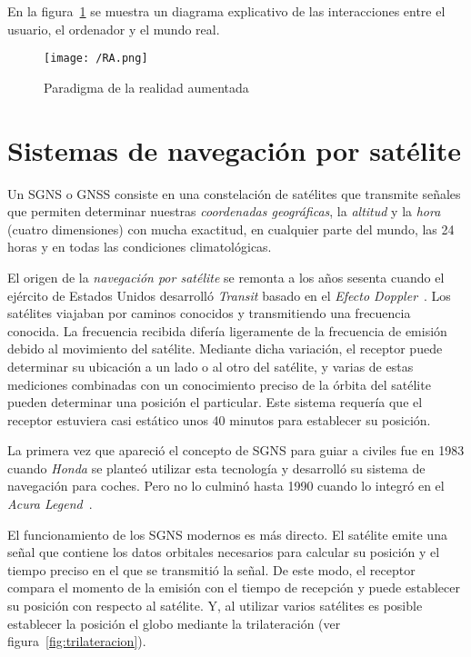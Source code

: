 En la figura~\ref{fig:ra} se muestra un diagrama explicativo de las interacciones entre el usuario,
el ordenador y el mundo real.

\begin{figure}[!h]
  \begin{center}
    \texttt{[image: /RA.png]}
    \caption{Paradigma de la realidad aumentada}
    \label{fig:ra}
  \end{center}
\end{figure}

\section{Sistemas de navegación por satélite}

Un \acs{SGNS} o \acs{GNSS} consiste en una constelación de satélites que transmite señales que
permiten determinar nuestras \emph{coordenadas geográficas}, la \emph{altitud} y la \emph{hora}
(cuatro dimensiones) con mucha exactitud, en cualquier parte del mundo, las 24 horas y en todas las
condiciones climatológicas.

El origen de la \emph{navegación por satélite} se remonta a los años sesenta cuando el ejército de
Estados Unidos desarrolló \emph{Transit} basado en el \emph{Efecto Doppler}~\cite{SN}. Los satélites
viajaban por caminos conocidos y transmitiendo una frecuencia conocida. La frecuencia recibida
difería ligeramente de la frecuencia de emisión debido al movimiento del satélite. Mediante dicha
variación, el receptor puede determinar su ubicación a un lado o al otro del satélite, y varias de
estas mediciones combinadas con un conocimiento preciso de la órbita del satélite pueden determinar
una posición el particular. Este sistema requería que el receptor estuviera casi estático unos 40
minutos para establecer su posición.

La primera vez que apareció el concepto de \acs{SGNS} para guiar a civiles fue en 1983 cuando
\emph{Honda} se planteó utilizar esta tecnología y desarrolló su sistema de navegación para
coches. Pero no lo culminó hasta 1990 cuando lo integró en el \emph{Acura Legend}~\cite{Parra13}.

El funcionamiento de los \acs{SGNS} modernos es más directo. El satélite emite una señal que
contiene los datos orbitales necesarios para calcular su posición y el tiempo preciso en el que se
transmitió la señal. De este modo, el receptor compara el momento de la emisión con el tiempo de
recepción y puede establecer su posición con respecto al satélite. Y, al utilizar varios satélites
es posible establecer la posición el globo mediante la trilateración (ver
figura~\ref{fig:trilateracion}). \\

